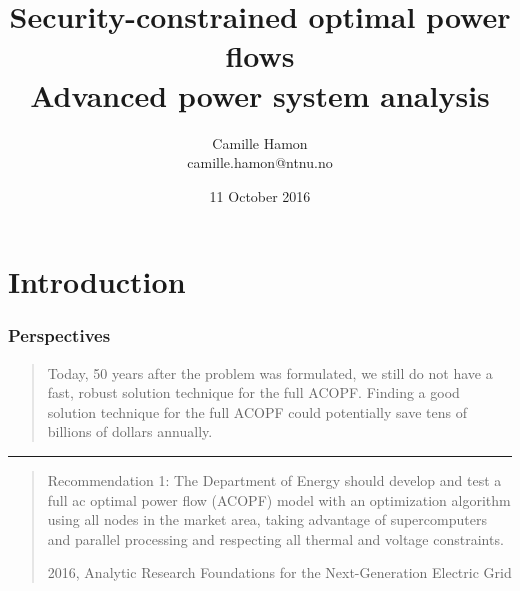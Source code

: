 \documentclass[compress]{beamer}
\title{Security-constrained optimal power flows\\Advanced power system analysis}
\author{Camille Hamon\\camille.hamon@ntnu.no}
\date{11 October 2016}
\makeatletter
\let\beamer@writeslidentry@miniframeson=\beamer@writeslidentry
\def\beamer@writeslidentry@miniframesoff{%
  \expandafter\beamer@ifempty\expandafter{\beamer@framestartpage}{}%
  {%
    \clearpage\beamer@notesactions%
  }
}
\newcommand*{\miniframeson}{\let\beamer@writeslidentry=\beamer@writeslidentry@miniframeson}
\newcommand*{\miniframesoff}{\let\beamer@writeslidentry=\beamer@writeslidentry@miniframesoff}
\makeatother
\begin{document}
\setlength{\abovedisplayskip}{0pt}
\setlength{\belowdisplayskip}{0pt}
\setlength{\abovedisplayshortskip}{0pt}
\setlength{\belowdisplayshortskip}{0pt}
\nocite{*}
\miniframesoff
\begin{frame}[plain]
  \titlepage
\end{frame}
\miniframeson

\section{Introduction}

\begin{frame}
  \frametitle{Perspectives}
\blockquote[\cite{Cain2012History}]{Today, 50 years after the problem was formulated, we still do not have a fast, robust solution technique for the full ACOPF.  Finding a good solution technique for the full ACOPF could potentially save tens of billions of dollars annually.}

\noindent\rule[0.5ex]{\linewidth}{1pt}

\blockquote[2016, Analytic Research Foundations for the Next-Generation Electric Grid]{Recommendation 1: The Department of Energy should develop and test a full ac optimal power flow
(ACOPF) model with an optimization algorithm using all nodes in the market area, taking advantage of
supercomputers and parallel processing and respecting all thermal and voltage constraints.} 

\end{frame}
\end{document}

